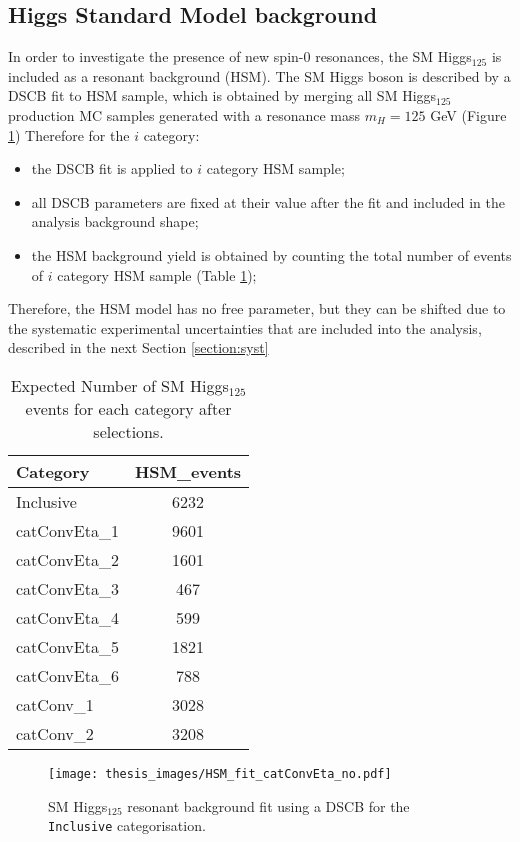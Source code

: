 \documentclass[a4paper, oneside, 11pt, openright]{book}
\begin{document}
 			\subsection{Higgs Standard Model background}
 				In order to investigate the presence of new spin-0 resonances, the SM Higgs$_{125}$ is included as a resonant background (HSM). The SM Higgs boson is described by a DSCB fit to HSM sample, which is obtained by merging all SM Higgs$_{125}$ production MC samples generated with a resonance mass $m_H=125$ GeV (Figure \ref{fig:HSM_fit}) Therefore for the $i$ category:
 				\begin{itemize}
 					\item the DSCB fit is applied to $i$ category HSM sample;
 					\item all DSCB parameters are fixed at their value after the fit and included in the analysis background shape;
 					\item the HSM background yield is obtained by counting the total number of events of $i$ category HSM sample (Table \ref{tab:HSM});
 				\end{itemize}  
 				Therefore, the HSM model has no free parameter, but they can be shifted due to the systematic experimental uncertainties that are included into the analysis, described in the next Section \ref{section:syst}
 				\begin{table}
 					\centering
						\begin{tabular}{lc}
							\toprule[1.5pt]
							Category &  HSM\_events \\
							\midrule
							Inclusive & 6232 \\
							\midrule
							catConvEta\_1 & 9601 \\
							catConvEta\_2 & 1601 \\
							catConvEta\_3 & 467 \\
							catConvEta\_4 & 599 \\
							catConvEta\_5 & 1821 \\
							catConvEta\_6 & 788 \\
							\midrule
							catConv\_1 & 3028 \\
							catConv\_2 & 3208 \\
							\bottomrule[1.5pt]
						\end{tabular}
 					\caption{Expected Number of SM Higgs$_{125}$ events for each category after selections.}
 					\label{tab:HSM}
 				\end{table}
 				\begin{figure}[]
 					\centering
 					\texttt{[image: thesis\_images/HSM\_fit\_catConvEta\_no.pdf]}
 					\caption{SM Higgs$_{125}$ resonant background fit using a DSCB for the \texttt{Inclusive} categorisation.}
 					\label{fig:HSM_fit}
 				\end{figure}
 			
\end{document}
